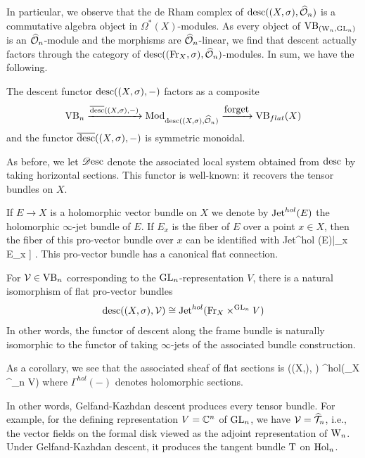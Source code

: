 \documentclass[10pt]{amsart}
\begin{document}
In particular, we observe that the de Rham complex of ${\rm desc}((X,\sigma),\widehat{\mathcal O}_n)$ is a commutative algebra object in $\Omega^*(X)$-modules. 
As every object of ${\rm VB}_{({{\rm W}_n}, {\rm GL}_n)}$ is an $\widehat{\mathcal O}_n$-module and the morphisms are $\widehat{\mathcal O}_n$-linear, 
we find that descent actually factors through the category of ${\rm desc}(({\rm Fr}_X,\sigma),\widehat{\mathcal O}_n)$-modules. 
In sum, we have the following.

\begin{lem}
The descent functor ${\rm desc}((X,\sigma),-)$ factors as a composite
\[
\VB_n \xto{\overline{\desc}((X,\sigma),-)} \Mod_{\desc((X,\sigma),\hO_n)} \xto{\txt{forget}} \VB_{flat}(X)
\]
and the functor $\overline{{\rm desc}}((X,\sigma),-)$ is symmetric monoidal.
\end{lem}

As before, we let $\mathscr{D}{\rm esc}$ denote the associated local system obtained from ${\rm desc}$ by taking horizontal sections. This functor is well-known: it recovers the tensor bundles on $X$.

If $E \to X$ is a holomorphic vector bundle on $X$ we denote by
${\rm Jet}^{hol}(E)$ the holomorphic $\infty$-jet bundle of $E$. If
$E_x$ is the fiber of $E$ over a point $x \in X$, then the fiber of
this pro-vector bundle over $x$ can be identified with
\ben
{\rm Jet}^{hol} (E)|_{x} \cong E_x \times \CC [[ t_1,\ldots,t_n]] .
\een
This pro-vector bundle has a canonical flat connection.

\begin{prop}
For $\mathcal{V} \in {\rm VB}_n$ corresponding to the ${\rm GL}_n$-representation $V$,
there is a natural isomorphism of flat pro-vector bundles
\[
{\rm desc}((X, \sigma),\mathcal{V}) \cong {\rm Jet}^{hol}({\rm Fr}_X
\times^{{\rm GL}_n} V)
\]
In other words, the functor of descent along the frame bundle is
naturally isomorphic to the functor of taking $\infty$-jets of the associated bundle construction.
\end{prop} 

As a corollary, we see that the associated sheaf of flat sections is
\ben
\sdesc ((X,\sigma), \cV) \cong \Gamma^{hol}(\Fr_X
\times^{\GL_n} V)
\een
where $\Gamma^{hol}(-)$ denotes holomorphic sections. 

In other words, Gelfand-Kazhdan descent produces every tensor bundle. 
For example, for the defining representation $V = \mathbb C^n$ of ${\rm GL}_n$, we have $\mathcal{V} =\widehat{\mathcal T}_n$, 
i.e., the vector fields on the formal disk viewed as the adjoint representation of  ${{\rm W}_n}$. 
Under Gelfand-Kazhdan descent, it produces the tangent bundle ${\rm T}$ on ${\rm Hol}_n$.

\end{document}
